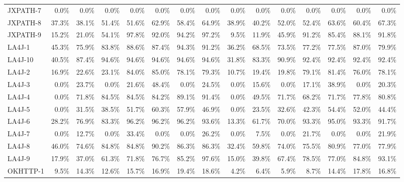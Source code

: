 \begin{tabular}{ l rrrrrrr rrrrrrr}
JXPATH-7 &  0.0\% &  0.0\% &  0.0\% &  0.0\% &  0.0\% &  0.0\% &  0.0\% &  0.0\% &  0.0\% &  0.0\% &  0.0\% &  0.0\% &  0.0\% &  0.0\%\\ 
JXPATH-8 &  37.3\% &  38.1\% &  51.4\% &  51.6\% &  62.9\% &  58.4\% &  64.9\% &  38.9\% &  40.2\% &  52.0\% &  52.4\% &  63.6\% &  60.4\% &  67.3\%\\ 
JXPATH-9 &  15.2\% &  21.0\% &  54.1\% &  97.8\% &  92.0\% &  94.2\% &  97.2\% &  9.5\% &  11.9\% &  45.9\% &  91.2\% &  85.4\% &  88.1\% &  91.8\%\\ 
LA4J-1 &  45.3\% &  75.9\% &  83.8\% &  88.6\% &  87.4\% &  94.3\% &  91.2\% &  36.2\% &  68.5\% &  73.5\% &  77.2\% &  77.5\% &  87.0\% &  79.9\%\\ 
LA4J-10 &  40.5\% &  87.4\% &  94.6\% &  94.6\% &  94.6\% &  94.6\% &  94.6\% &  31.8\% &  83.3\% &  90.9\% &  92.4\% &  92.4\% &  92.4\% &  92.4\%\\ 
LA4J-2 &  16.9\% &  22.6\% &  23.1\% &  84.0\% &  85.0\% &  78.1\% &  79.3\% &  10.7\% &  19.4\% &  19.8\% &  79.1\% &  81.4\% &  76.0\% &  78.1\%\\ 
LA4J-3 &  0.0\% &  23.7\% &  0.0\% &  21.6\% &  48.4\% &  0.0\% &  24.5\% &  0.0\% &  15.6\% &  0.0\% &  17.1\% &  38.9\% &  0.0\% &  20.3\%\\ 
LA4J-4 &  0.0\% &  71.8\% &  84.5\% &  84.5\% &  84.2\% &  89.1\% &  91.4\% &  0.0\% &  49.5\% &  71.7\% &  68.2\% &  71.7\% &  77.8\% &  80.8\%\\ 
LA4J-5 &  0.0\% &  31.5\% &  38.5\% &  51.7\% &  60.3\% &  57.9\% &  46.9\% &  0.0\% &  23.5\% &  32.6\% &  42.3\% &  54.4\% &  52.0\% &  44.4\%\\ 
LA4J-6 &  28.2\% &  76.9\% &  83.3\% &  96.2\% &  96.2\% &  96.2\% &  93.6\% &  13.3\% &  61.7\% &  70.0\% &  93.3\% &  95.0\% &  93.3\% &  91.7\%\\ 
LA4J-7 &  0.0\% &  12.7\% &  0.0\% &  33.4\% &  0.0\% &  0.0\% &  26.2\% &  0.0\% &  7.5\% &  0.0\% &  21.7\% &  0.0\% &  0.0\% &  21.9\%\\ 
LA4J-8 &  46.0\% &  74.6\% &  84.8\% &  84.8\% &  90.2\% &  86.3\% &  86.3\% &  32.4\% &  59.8\% &  74.0\% &  75.5\% &  80.9\% &  77.0\% &  77.9\%\\ 
LA4J-9 &  17.9\% &  37.0\% &  61.3\% &  71.8\% &  76.7\% &  85.2\% &  97.6\% &  15.0\% &  39.8\% &  67.4\% &  78.5\% &  77.0\% &  84.8\% &  93.1\%\\ 
OKHTTP-1 &  9.5\% &  14.3\% &  12.6\% &  15.7\% &  16.9\% &  19.4\% &  18.6\% &  4.2\% &  6.4\% &  5.9\% &  8.7\% &  14.4\% &  17.8\% &  16.8\%\\ 

\end{tabular}
